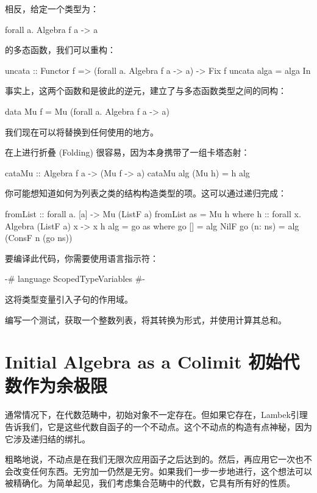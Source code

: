 \documentclass[DaoFP]{subfiles}
\begin{document}
 相反，给定一个类型为：
 \begin{haskell}
  forall a. Algebra f a -> a
 \end{haskell}
 的多态函数，我们可以重构：
 \begin{haskell}
  uncata :: Functor f => (forall a. Algebra f a -> a) -> Fix f
  uncata alga = alga In
 \end{haskell}
 事实上，这两个函数和是彼此的逆元，建立了与多态函数类型之间的同构：
 \begin{haskell}
  data Mu f = Mu (forall a. Algebra f a -> a)
 \end{haskell}
 我们现在可以将替换到任何使用的地方。

 在上进行折叠 (Folding) 很容易，因为本身携带了一组卡塔态射：
 \begin{haskell}
  cataMu :: Algebra f a -> (Mu f -> a)
  cataMu alg (Mu h) = h alg
 \end{haskell}

 你可能想知道如何为列表之类的结构构造类型的项。这可以通过递归完成：
 \begin{haskell}
  fromList :: forall a. [a] -> Mu (ListF a)
  fromList as = Mu h
  where h :: forall x. Algebra (ListF a) x -> x
  h alg = go as
  where
  go [] = alg NilF
  go (n: ns) = alg (ConsF n (go ns))
 \end{haskell}
 要编译此代码，你需要使用语言指示符：
 \begin{haskell}
 {-# language ScopedTypeVariables #-}
 \end{haskell}
 这将类型变量引入子句的作用域。

 \begin{exercise}
  编写一个测试，获取一个整数列表，将其转换为形式，并使用计算其总和。
 \end{exercise}

 \section{Initial Algebra as a Colimit 初始代数作为余极限}

 通常情况下，在代数范畴中，初始对象不一定存在。但如果它存在，Lambek引理告诉我们，它是这些代数自函子的一个不动点。这个不动点的构造有点神秘，因为它涉及递归结的绑扎。

 粗略地说，不动点是在我们无限次应用函子之后达到的。然后，再应用它一次也不会改变任何东西。无穷加一仍然是无穷。如果我们一步一步地进行，这个想法可以被精确化。为简单起见，我们考虑集合范畴中的代数，它具有所有好的性质。
\end{document}
